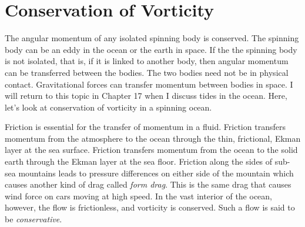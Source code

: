 \section{Conservation of Vorticity}
The angular momentum of any isolated
spinning body is conserved. The spinning body can be an eddy in the
ocean or the earth in space. If the the spinning body is not isolated,
that is, if it is linked to another body, then angular momentum can be
transferred between the bodies. The two bodies need not be in physical
contact. Gravitational forces can transfer momentum between bodies in
space.  I will return to this topic in Chapter 17 when I discuss tides
in the ocean. Here, let's look at conservation of vorticity in a
spinning ocean.

Friction is essential for the transfer of momentum in a
fluid. Friction transfers momentum from the atmosphere to the ocean
through the thin, frictional, Ekman layer at the sea
surface. Friction transfers momentum from the ocean
to the solid earth through the Ekman layer at the sea floor. Friction
along the sides of sub-sea mountains leads to pressure differences on
either side of the mountain which causes another kind of drag called
\textit{form drag}. This is the same drag that
causes wind force on cars moving at high speed. In the vast interior
of the ocean, however, the flow is frictionless, and vorticity is
conserved. Such a flow is said to be
\textit{conservative}.

